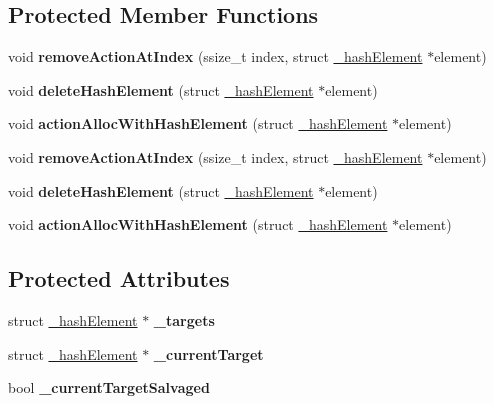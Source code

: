 \subsection*{Protected Member Functions}
\begin{DoxyCompactItemize}
\item 
\mbox{\label{classActionManager_a04e8cfbaa84f641816e069c920f21a77}} 
void {\bfseries remove\+Action\+At\+Index} (ssize\+\_\+t index, struct \hyperlink{struct__hashElement}{\+\_\+hash\+Element} $\ast$element)
\item 
\mbox{\label{classActionManager_a4ae318342f03fde102a8b0336ba04bf7}} 
void {\bfseries delete\+Hash\+Element} (struct \hyperlink{struct__hashElement}{\+\_\+hash\+Element} $\ast$element)
\item 
\mbox{\label{classActionManager_a0dabc4984677c23f9c99e792a797d35e}} 
void {\bfseries action\+Alloc\+With\+Hash\+Element} (struct \hyperlink{struct__hashElement}{\+\_\+hash\+Element} $\ast$element)
\item 
\mbox{\label{classActionManager_a04e8cfbaa84f641816e069c920f21a77}} 
void {\bfseries remove\+Action\+At\+Index} (ssize\+\_\+t index, struct \hyperlink{struct__hashElement}{\+\_\+hash\+Element} $\ast$element)
\item 
\mbox{\label{classActionManager_a4ae318342f03fde102a8b0336ba04bf7}} 
void {\bfseries delete\+Hash\+Element} (struct \hyperlink{struct__hashElement}{\+\_\+hash\+Element} $\ast$element)
\item 
\mbox{\label{classActionManager_a0dabc4984677c23f9c99e792a797d35e}} 
void {\bfseries action\+Alloc\+With\+Hash\+Element} (struct \hyperlink{struct__hashElement}{\+\_\+hash\+Element} $\ast$element)
\end{DoxyCompactItemize}
\subsection*{Protected Attributes}
\begin{DoxyCompactItemize}
\item 
\mbox{\label{classActionManager_a4ecb2c480aa03f0008a5fc4ce02d4116}} 
struct \hyperlink{struct__hashElement}{\+\_\+hash\+Element} $\ast$ {\bfseries \+\_\+targets}
\item 
\mbox{\label{classActionManager_aaa333e4b077cb7c136f5652e551582d3}} 
struct \hyperlink{struct__hashElement}{\+\_\+hash\+Element} $\ast$ {\bfseries \+\_\+current\+Target}
\item 
\mbox{\label{classActionManager_a2bd8759a3fe91ac84392c419b53ec466}} 
bool {\bfseries \+\_\+current\+Target\+Salvaged}
\end{DoxyCompactItemize}


